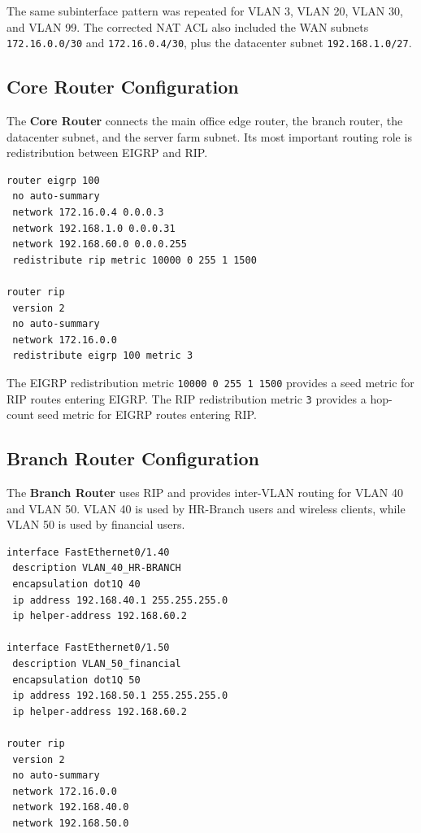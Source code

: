 \documentclass[12pt,a4paper]{article}
\begin{document}
The same subinterface pattern was repeated for VLAN 3, VLAN 20, VLAN 30, and VLAN 99. The corrected NAT ACL also included the WAN subnets \texttt{172.16.0.0/30} and \texttt{172.16.0.4/30}, plus the datacenter subnet \texttt{192.168.1.0/27}.

\subsection{Core Router Configuration}

The \textbf{Core Router} connects the main office edge router, the branch router, the datacenter subnet, and the server farm subnet. Its most important routing role is redistribution between EIGRP and RIP.

\begin{lstlisting}[caption={Simplified core router route redistribution commands.}]
router eigrp 100
 no auto-summary
 network 172.16.0.4 0.0.0.3
 network 192.168.1.0 0.0.0.31
 network 192.168.60.0 0.0.0.255
 redistribute rip metric 10000 0 255 1 1500

router rip
 version 2
 no auto-summary
 network 172.16.0.0
 redistribute eigrp 100 metric 3
\end{lstlisting}

The EIGRP redistribution metric \texttt{10000 0 255 1 1500} provides a seed metric for RIP routes entering EIGRP. The RIP redistribution metric \texttt{3} provides a hop-count seed metric for EIGRP routes entering RIP.

\subsection{Branch Router Configuration}

The \textbf{Branch Router} uses RIP and provides inter-VLAN routing for VLAN 40 and VLAN 50. VLAN 40 is used by HR-Branch users and wireless clients, while VLAN 50 is used by financial users.

\begin{lstlisting}[caption={Simplified branch router inter-VLAN and RIP commands.}]
interface FastEthernet0/1.40
 description VLAN_40_HR-BRANCH
 encapsulation dot1Q 40
 ip address 192.168.40.1 255.255.255.0
 ip helper-address 192.168.60.2

interface FastEthernet0/1.50
 description VLAN_50_financial
 encapsulation dot1Q 50
 ip address 192.168.50.1 255.255.255.0
 ip helper-address 192.168.60.2

router rip
 version 2
 no auto-summary
 network 172.16.0.0
 network 192.168.40.0
 network 192.168.50.0
\end{lstlisting}
\end{document}
